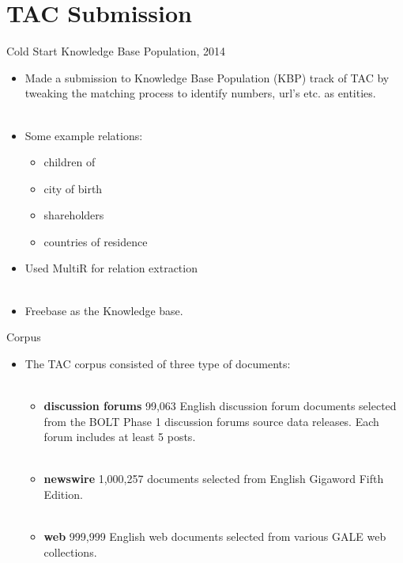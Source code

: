 \documentclass{beamer}
\begin{document}
\section{TAC Submission}
\begin{frame}{Cold Start Knowledge Base Population, 2014}
\begin{itemize}
\item Made a submission to Knowledge Base Population (KBP) track of TAC by tweaking the matching process to identify numbers, url's etc. as entities.\pause \\~\\
 \item Some example relations: 
    \begin{itemize}
      \item children of 
      \item city of birth  
      \item shareholders
      \item countries of residence
    \end{itemize}
  \item  Used MultiR for relation extraction\\~\\
  \item Freebase as the Knowledge base.
\end{itemize}
\end{frame}

\begin{frame}{Corpus}
 \begin{itemize}
  \item The TAC corpus consisted of three type of documents: \pause \\~\\
    \begin{itemize}
	\item \textbf{discussion forums } 99,063 English discussion forum documents selected from the BOLT Phase 1 discussion forums source data releases. Each forum includes at least 5 posts. \pause \\~\\

	\item \textbf{newswire } 1,000,257 documents selected from English Gigaword Fifth Edition. \pause \\~\\

	 \item \textbf{web} 999,999 English web documents selected from various GALE web collections. \pause \\~\\
    \end{itemize}
      
 \end{itemize}
\end{frame}
\end{document}
